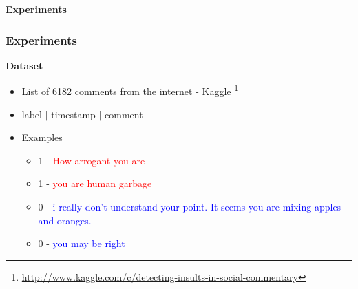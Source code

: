 \documentclass{beamer}
\begin{document}
    \begin{frame}
        \begin{center}
            \textbf{Experiments}
        \end{center}
    \end{frame}
    
    \begin{frame}
        \frametitle{Experiments}
        \begin{center}
            \textbf{Dataset}
        \end{center}
        \begin{itemize}
            \item{List of 6182 comments from the internet - Kaggle \footnote{\url{http://www.kaggle.com/c/detecting-insults-in-social-commentary}}}
            \item{label $|$ timestamp $|$ comment}
            \item{
            Examples
            \begin{itemize}
                \item{1 - \textcolor{red}{How arrogant you are}}
                \item{1 - \textcolor{red}{you are human garbage}}
                \item{0 - \textcolor{blue}{i really don't understand your point. It seems you are mixing apples and oranges.}}
                \item{0 - \textcolor{blue}{you may be right}}
            \end{itemize}
            }
        \end{itemize}
    \end{frame}
    
\end{document}
